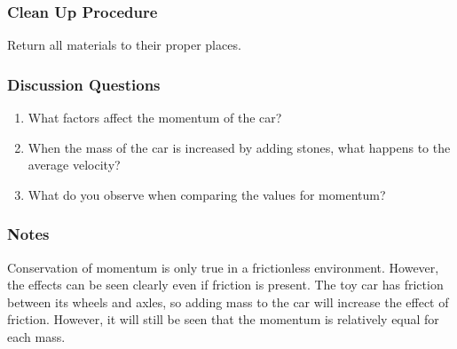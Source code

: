 \subsubsection*{Clean Up Procedure}
Return all materials to their proper places.

\subsubsection*{Discussion Questions}
\begin{enumerate}
\item{What factors affect the momentum of the car?}
\item{When the mass of the car is increased by adding stones, what happens to the average velocity?}
\item{What do you observe when comparing the values for momentum?}
\end{enumerate}

\subsubsection*{Notes}
Conservation of momentum is only true in a frictionless environment.  However, the effects can be seen clearly even if friction is present.  The toy car has friction between its wheels and axles, so adding mass to the car will increase the effect of friction.  However, it will still be seen that the momentum is relatively equal for each mass.



